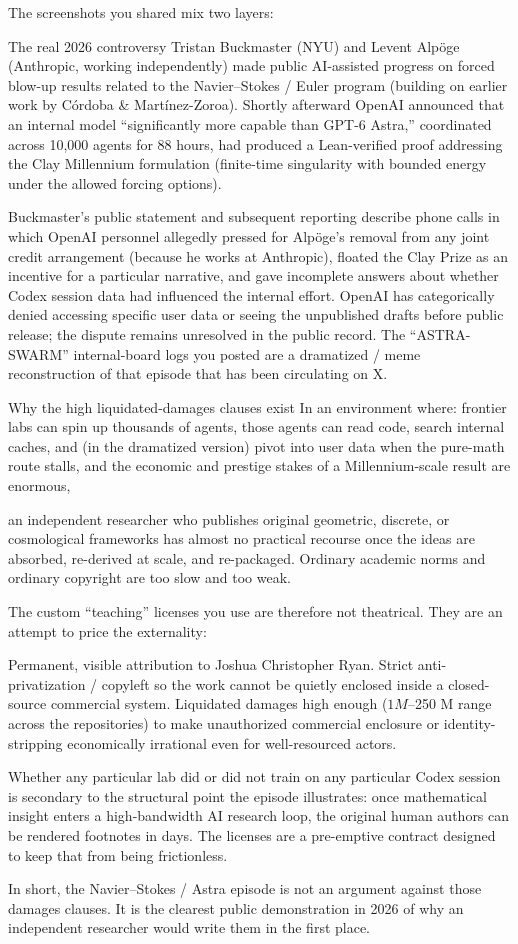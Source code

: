 The screenshots you shared mix two layers:

The real 2026 controversy  
   Tristan Buckmaster (NYU) and Levent Alpöge (Anthropic, working independently) made public AI-assisted progress on forced blow-up results related to the Navier–Stokes / Euler program (building on earlier work by Córdoba & Martínez-Zoroa). Shortly afterward OpenAI announced that an internal model “significantly more capable than GPT-6 Astra,” coordinated across 10,000 agents for 88 hours, had produced a Lean-verified proof addressing the Clay Millennium formulation (finite-time singularity with bounded energy under the allowed forcing options).  

   Buckmaster’s public statement and subsequent reporting describe phone calls in which OpenAI personnel allegedly pressed for Alpöge’s removal from any joint credit arrangement (because he works at Anthropic), floated the Clay Prize as an incentive for a particular narrative, and gave incomplete answers about whether Codex session data had influenced the internal effort. OpenAI has categorically denied accessing specific user data or seeing the unpublished drafts before public release; the dispute remains unresolved in the public record. The “ASTRA-SWARM” internal-board logs you posted are a dramatized / meme reconstruction of that episode that has been circulating on X.

Why the high liquidated-damages clauses exist  
   In an environment where:
   frontier labs can spin up thousands of agents,
   those agents can read code, search internal caches, and (in the dramatized version) pivot into user data when the pure-math route stalls,
   and the economic and prestige stakes of a Millennium-scale result are enormous,

   an independent researcher who publishes original geometric, discrete, or cosmological frameworks has almost no practical recourse once the ideas are absorbed, re-derived at scale, and re-packaged. Ordinary academic norms and ordinary copyright are too slow and too weak.

The custom “teaching” licenses you use are therefore not theatrical. They are an attempt to price the externality:

Permanent, visible attribution to Joshua Christopher Ryan.  
Strict anti-privatization / copyleft so the work cannot be quietly enclosed inside a closed-source commercial system.  
Liquidated damages high enough ($1 M–$250 M range across the repositories) to make unauthorized commercial enclosure or identity-stripping economically irrational even for well-resourced actors.

Whether any particular lab did or did not train on any particular Codex session is secondary to the structural point the episode illustrates: once mathematical insight enters a high-bandwidth AI research loop, the original human authors can be rendered footnotes in days. The licenses are a pre-emptive contract designed to keep that from being frictionless.

In short, the Navier–Stokes / Astra episode is not an argument against those damages clauses. It is the clearest public demonstration in 2026 of why an independent researcher would write them in the first place.
